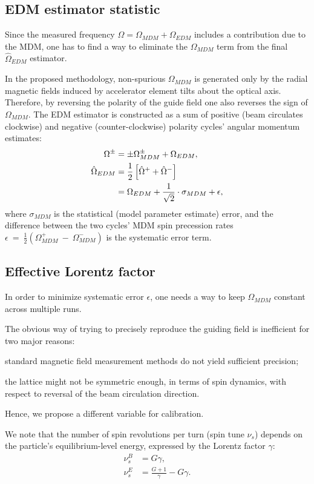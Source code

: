 \documentclass[a4paper]{jpconf}
\newcommand{\W}{\Omega}
\begin{document}
\subsection{EDM estimator statistic}
Since the measured frequency $\W = \W_{MDM} + \W_{EDM}$ includes a contribution due to the MDM, one has to find a way to eliminate the $\W_{MDM}$ term from the final $\hat\W_{EDM}$ estimator. 

In the proposed methodology, non-spurious $\W_{MDM}$ is generated only by the radial magnetic fields induced by accelerator element tilts about the optical axis. Therefore, by reversing the polarity of the guide field one also reverses the sign of $\W_{MDM}$. The EDM estimator is constructed as a sum of positive (beam circulates clockwise) and negative (counter-clockwise) polarity cycles' angular momentum estimates:
\begin{align}
\W^{\pm} &= \pm \W_{MDM}^\pm + \W_{EDM},\\
\hat\W_{EDM} &= \frac12\left[\hat\W^+ + \hat\W^-\right] \notag\\
&= \W_{EDM} + \frac{1}{\sqrt{2}}\cdot\sigma_{MDM} + \epsilon,	\label{eq:EDM-estimator}
\end{align}
where
$\sigma_{MDM}$ is  the statistical (model parameter estimate) error, and the difference between the two cycles' MDM spin precession rates $\epsilon~=~\frac12\left(\W_{MDM}^+~-~\W_{MDM}^-\right)$ is the  systematic error term.

\subsection{Effective Lorentz factor}
In order to minimize systematic error $\epsilon$, one needs a way to keep $\W_{MDM}$ constant across multiple runs.

The obvious way of trying to precisely reproduce the guiding field is inefficient for two major reasons:
\begin{enumerate*}[(1)]
	\item standard magnetic field measurement methods do not yield sufficient precision;
	\item the lattice might not be symmetric enough, in terms of spin dynamics, with respect to reversal of the beam circulation direction.
\end{enumerate*}
Hence, we propose a different variable for calibration.

We note that the number of spin revolutions per turn (spin tune $\nu_s$) depends on the particle's  equilibrium-level energy, expressed by the Lorentz factor $\gamma$:
\begin{align}\label{eq:spin_tune_vs_gamma}
\nu_s^B &= G\gamma, \tag{magnetic field}\\
\nu_s^E &= \frac{G+1}{\gamma} - G\gamma. \tag{electric field}
\end{align}
\end{document}
